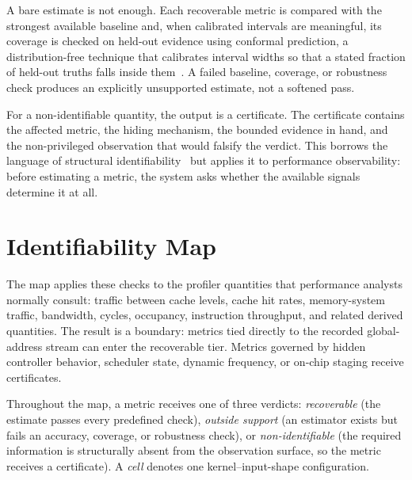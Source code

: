 \documentclass[conference]{IEEEtran}
\begin{document}
A bare estimate is not enough. Each recoverable metric is compared with the
strongest available baseline and, when calibrated intervals are meaningful, its
coverage is checked on held-out evidence using conformal prediction, a
distribution-free technique that calibrates interval widths so that a stated
fraction of held-out truths falls inside them~\cite{vovk2005alrw}. A failed
baseline, coverage, or robustness check produces an explicitly unsupported
estimate, not a softened pass.

For a non-identifiable quantity, the output is a certificate. The certificate
contains the affected metric, the hiding mechanism, the bounded evidence in
hand, and the non-privileged observation that would falsify the verdict. This
borrows the language of structural identifiability~\cite{villaverde2016structural}
but applies it to performance observability: before estimating a metric, the
system asks whether the available signals determine it at all.

\section{Identifiability Map}
\label{sec:map}

The map applies these checks to the profiler quantities that performance analysts
normally consult: traffic between cache levels, cache hit rates, memory-system
traffic, bandwidth, cycles, occupancy, instruction throughput, and related
derived quantities. The result is a boundary: metrics tied directly to the
recorded global-address stream can enter the recoverable tier. Metrics governed
by hidden controller behavior, scheduler state, dynamic frequency, or on-chip
staging receive certificates.

Throughout the map, a metric receives one of three verdicts:
\emph{recoverable} (the estimate passes every predefined check),
\emph{outside support} (an estimator exists but fails an accuracy, coverage,
or robustness check), or \emph{non-identifiable} (the required information is
structurally absent from the observation surface, so the metric receives a
certificate). A \emph{cell} denotes one kernel--input-shape configuration.
\end{document}
